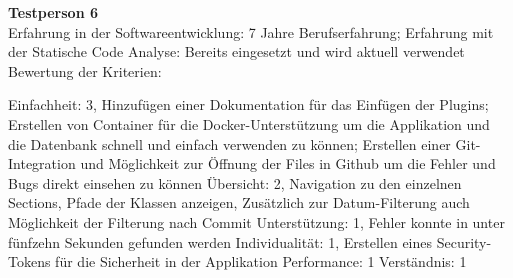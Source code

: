 \textbf{Testperson 6} \\
Erfahrung in der Softwareentwicklung: 7 Jahre Berufserfahrung; Erfahrung mit der Statische Code Analyse: Bereits eingesetzt und wird aktuell verwendet\\
Bewertung der Kriterien:

Einfachheit: 3, Hinzufügen einer Dokumentation für das Einfügen der Plugins; Erstellen von Container für die Docker-Unterstützung um die Applikation und die Datenbank schnell und einfach verwenden zu können; Erstellen einer Git-Integration und Möglichkeit zur Öffnung der Files in Github um die Fehler und Bugs direkt einsehen zu können \newline Übersicht: 2, Navigation zu den einzelnen Sections, Pfade der Klassen anzeigen, Zusätzlich zur Datum-Filterung auch Möglichkeit der Filterung nach Commit \newline  Unterstützung: 1, Fehler konnte in unter fünfzehn Sekunden gefunden werden \newline Individualität: 1, Erstellen eines Security-Tokens für die Sicherheit in der Applikation \newline Performance: 1 \newline  Verständnis: 1\newline 

